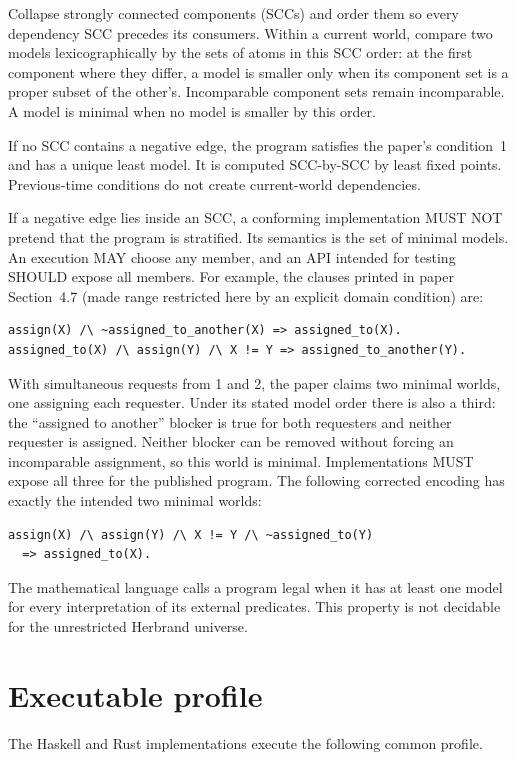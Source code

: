 \documentclass[11pt]{article}
\begin{document}
Collapse strongly connected components (SCCs) and order them so every
dependency SCC precedes its consumers.  Within a current world, compare two
models lexicographically by the sets of atoms in this SCC order: at the first
component where they differ, a model is smaller only when its component set
is a proper subset of the other's.  Incomparable component sets remain
incomparable.  A model is minimal when no model is smaller by this order.

If no SCC contains a negative edge, the program satisfies the paper's
condition~1 and has a unique least model.  It is computed SCC-by-SCC by least
fixed points.  Previous-time conditions do not create current-world
dependencies.

If a negative edge lies inside an SCC, a conforming implementation MUST NOT
pretend that the program is stratified.  Its semantics is the set of minimal
models.  An execution MAY choose any member, and an API intended for testing
SHOULD expose all members.  For example, the clauses printed in paper
Section~4.7 (made range restricted here by an explicit domain condition) are:
\begin{verbatim}
assign(X) /\ ~assigned_to_another(X) => assigned_to(X).
assigned_to(X) /\ assign(Y) /\ X != Y => assigned_to_another(Y).
\end{verbatim}
With simultaneous requests from 1 and 2, the paper claims two minimal worlds,
one assigning each requester.  Under its stated model order there is also a
third: the ``assigned to another'' blocker is true for both requesters and
neither requester is assigned.
Neither blocker can be removed without forcing an incomparable assignment,
so this world is minimal.  Implementations MUST expose all three for the
published program.  The following corrected encoding has exactly the intended
two minimal worlds:
\begin{verbatim}
assign(X) /\ assign(Y) /\ X != Y /\ ~assigned_to(Y)
  => assigned_to(X).
\end{verbatim}

The mathematical language calls a program legal when it has at least one
model for every interpretation of its external predicates.  This property is
not decidable for the unrestricted Herbrand universe.

\section{Executable profile}\label{sec:profile}

The Haskell and Rust implementations execute the following common profile.
\end{document}
